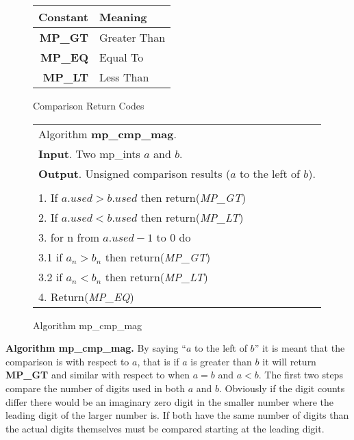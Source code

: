 \documentclass[b5paper]{book}
\begin{document}
\begin{figure}[here]
\begin{center}
\begin{tabular}{|r|l|}
\hline \textbf{Constant} & \textbf{Meaning} \\
\hline \textbf{MP\_GT} & Greater Than \\
\hline \textbf{MP\_EQ} & Equal To \\
\hline \textbf{MP\_LT} & Less Than \\
\hline
\end{tabular}
\end{center}
\caption{Comparison Return Codes}
\end{figure}

\begin{figure}[here]
\begin{center}
\begin{tabular}{l}
\hline Algorithm \textbf{mp\_cmp\_mag}. \\
\textbf{Input}.   Two mp\_ints $a$ and $b$.  \\
\textbf{Output}.  Unsigned comparison results ($a$ to the left of $b$). \\
\hline \\
1.  If $a.used > b.used$ then return(\textit{MP\_GT}) \\
2.  If $a.used < b.used$ then return(\textit{MP\_LT}) \\
3.  for n from $a.used - 1$ to 0 do \\
\hspace{+3mm}3.1  if $a_n > b_n$ then return(\textit{MP\_GT}) \\
\hspace{+3mm}3.2  if $a_n < b_n$ then return(\textit{MP\_LT}) \\
4.  Return(\textit{MP\_EQ}) \\
\hline
\end{tabular}
\end{center}
\caption{Algorithm mp\_cmp\_mag}
\end{figure}

\textbf{Algorithm mp\_cmp\_mag.}
By saying ``$a$ to the left of $b$'' it is meant that the comparison is with respect to $a$, that is if $a$ is greater than $b$ it will return
\textbf{MP\_GT} and similar with respect to when $a = b$ and $a < b$.  The first two steps compare the number of digits used in both $a$ and $b$.  
Obviously if the digit counts differ there would be an imaginary zero digit in the smaller number where the leading digit of the larger number is.  
If both have the same number of digits than the actual digits themselves must be compared starting at the leading digit.  
\end{document}
